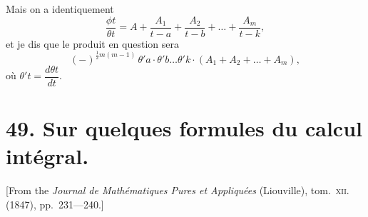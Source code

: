 \documentclass[12pt,a4paper]{article}
\theoremstyle{plain}
\begin{document}
Mais on a identiquement
\[
\frac{\phi t}{\theta t} = A + \frac{A_1}{t-a} + \frac{A_2}{t-b} + \ldots + \frac{A_m}{t-k},
\]
et je dis que le produit en question sera
\[
(-)^{\frac{1}{2}m(m-1)}\,\theta' a \cdot \theta' b \ldots \theta' k \cdot (A_1 + A_2 + \ldots + A_m),
\]
où $\theta' t = \dfrac{d\theta t}{dt}$.

\newpage


\section*{49. Sur quelques formules du calcul int\'egral.}

[From the \textit{Journal de Math\'ematiques Pures et Appliqu\'ees} (Liouville), tom.~\textsc{xii}. (1847), pp.~231---240.]

\bigskip
\end{document}
